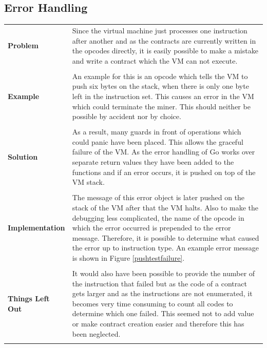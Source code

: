 \subsection{Error Handling}
\begin{tabular}[t]{ p{3cm} p{12.5cm}}
\raggedright
\textbf{Problem} &
Since the virtual machine just processes one instruction after another and as the contracts are currently written in the opcodes directly, it is easily possible to make a mistake and write a contract which the VM can not execute. \\ \\

\raggedright
\textbf{Example} &
An example for this is an opcode which tells the VM to push six bytes on the stack, when there is only one byte left in the instruction set. This causes an error in the VM which could terminate the miner. This should neither be possible by accident nor by choice. \\ \\

\raggedright
\textbf{Solution} &
As a result, many guards in front of operations which could panic have been placed. This allows the graceful failure of the VM. As the error handling of Go works over separate return values they have been added to the functions and if an error occurs, it is pushed on top of the VM stack. \\ \\

\raggedright
\textbf{Implementation} &
The message of this error object is later pushed on the stack of the VM after that the VM halts. Also to make the debugging less complicated, the name of the opcode in which the error occurred is prepended to the error message. Therefore, it is possible to determine what caused the error up to instruction type. An example error message is shown in Figure \ref{pushtestfailure}. \\ \\

\raggedright
\textbf{Things Left Out} &
It would also have been possible to provide the number of the instruction that failed but as the code of a contract gets larger and as the instructions are not enumerated, it becomes very time consuming to count all codes to determine which one failed. This seemed not to add value or make contract creation easier and therefore this has been neglected. \\ \\
\end{tabular}

